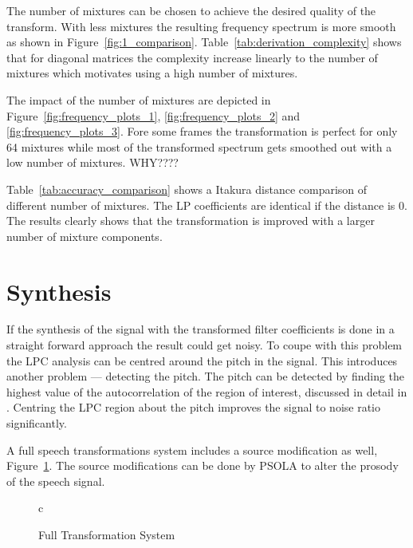 The number of mixtures can be chosen to achieve the desired quality of the transform. With less mixtures the resulting frequency spectrum is more smooth as shown in Figure~\ref{fig:1_comparison}. Table~\ref{tab:derivation_complexity} shows that for diagonal matrices the complexity increase linearly to the number of mixtures which motivates using a high number of mixtures.

The impact of the number of mixtures are depicted in Figure~\ref{fig:frequency_plots_1}, \ref{fig:frequency_plots_2} and \ref{fig:frequency_plots_3}. Fore some frames the transformation is perfect for only 64 mixtures while most of the transformed spectrum gets smoothed out with a low number of mixtures. WHY????

Table~\ref{tab:accuracy_comparison} shows a Itakura distance comparison of different number of mixtures. The LP coefficients are identical if the distance is 0. The results clearly shows that the transformation is improved with a larger number of mixture components.

\section{Synthesis} %
\label{sec:synthesis}
If the synthesis of the signal with the transformed filter coefficients is done in a straight forward approach the result could get noisy. To coupe with this problem the LPC analysis can be centred around the pitch in the signal. This introduces another problem --- detecting the pitch. The pitch can be detected by finding the highest value of the autocorrelation of the region of interest, discussed in detail in \cite[p. 324]{taletek}. Centring the LPC region about the pitch improves the signal to noise ratio significantly.

A full speech transformations system includes a source modification as well, Figure~\ref{fig:VC_full}. The source modifications can be done by PSOLA \cite[p.820]{taletek} to alter the prosody of the speech signal.

\begin{figure}[htbp]
  \centering
   \begin{tabular}[h]{c}
  \end{tabular}
  \caption{Full Transformation System}
  \label{fig:VC_full}
\end{figure}
